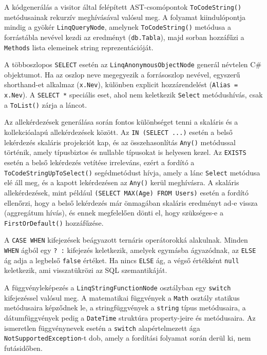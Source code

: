 \documentclass[a4paper,12pt]{article}
\begin{document}
A kódgenerálás a visitor által felépített AST-csomópontok \texttt{ToCodeString()} metódusainak rekurzív meghívásával valósul meg. A folyamat kiindulópontja mindig a gyökér \texttt{LinqQueryNode}, amelynek \texttt{ToCodeString()} metódusa a forrástábla nevével kezdi az eredményt (\texttt{db.Tabla}), majd sorban hozzáfűzi a \texttt{Methods} lista elemeinek string reprezentációját.

A többoszlopos \texttt{SELECT} esetén az \texttt{LinqAnonymousObjectNode} generál névtelen C\# objektumot. Ha az oszlop neve megegyezik a forrásoszlop nevével, egyszerű shorthand-et alkalmaz (\texttt{x.Nev}), különben explicit hozzárendelést (\texttt{Alias = x.Nev}). A \texttt{SELECT *} speciális eset, ahol nem keletkezik \texttt{Select} metódushívás, csak a \texttt{ToList()} zárja a láncot.

Az allekérdezések generálása során fontos különbséget tenni a skaláris és a kollekcióalapú allekérdezések között. Az \texttt{IN (SELECT ...)} esetén a belső lekérdezés skaláris projekciót kap, és az összehasonlítás \texttt{Any()} metódussal történik, amely típusbiztos és nullable típusokat is helyesen kezel. Az \texttt{EXISTS} esetén a belső lekérdezés vetítése irreleváns, ezért a fordító a \texttt{ToCodeStringUpToSelect()} segédmetódust hívja, amely a lánc \texttt{Select} metódusa elé áll meg, és a kapott lekérdezésen az \texttt{Any()} kerül meghívásra. A skaláris allekérdezések, mint például \texttt{(SELECT MAX(Age) FROM Users)} esetén a fordító ellenőrzi, hogy a belső lekérdezés már önmagában skaláris eredményt ad-e vissza (aggregátum hívás), és ennek megfelelően dönti el, hogy szükséges-e a \texttt{FirstOrDefault()} hozzáfűzése.

A \texttt{CASE WHEN} kifejezések beágyazott ternáris operátorokká alakulnak. Minden \texttt{WHEN} ágból egy \texttt{? :} kifejezés keletkezik, amelyek egymásba ágyazódnak, az \texttt{ELSE} ág adja a legbelső \texttt{false} értéket. Ha nincs \texttt{ELSE} ág, a végső értékként \texttt{null} keletkezik, ami visszatükrözi az SQL szemantikáját.

A függvényleképezés a \texttt{LinqStringFunctionNode} osztályban egy \texttt{switch} kifejezéssel valósul meg. A matematikai függvények a \texttt{Math} osztály statikus metódusaira képződnek le, a stringfüggvények a \texttt{string} típus metódusaira, a dátumfüggvények pedig a \texttt{DateTime} struktúra property-jeire és metódusaira. Az ismeretlen függvénynevek esetén a \texttt{switch} alapértelmezett ága \texttt{NotSupportedException}-t dob, amely a fordítási folyamat során derül ki, nem futásidőben.
\end{document}
